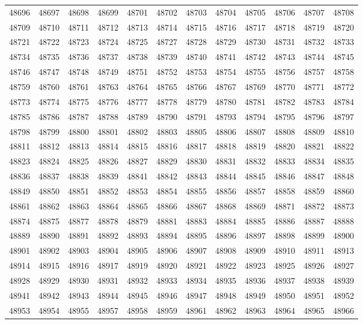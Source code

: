 \begin{center}
\begin{longtable}{llllllllllll}
48696 &48697 &48698 &48699 &48701 &48702 &48703 &48704 &48705 &48706 &48707 &48708 \\
48709 &48710 &48711 &48712 &48713 &48714 &48715 &48716 &48717 &48718 &48719 &48720 \\
48721 &48722 &48723 &48724 &48725 &48727 &48728 &48729 &48730 &48731 &48732 &48733 \\
48734 &48735 &48736 &48737 &48738 &48739 &48740 &48741 &48742 &48743 &48744 &48745 \\
48746 &48747 &48748 &48749 &48751 &48752 &48753 &48754 &48755 &48756 &48757 &48758 \\
48759 &48760 &48761 &48763 &48764 &48765 &48766 &48767 &48769 &48770 &48771 &48772 \\
48773 &48774 &48775 &48776 &48777 &48778 &48779 &48780 &48781 &48782 &48783 &48784 \\
48785 &48786 &48787 &48788 &48789 &48790 &48791 &48793 &48794 &48795 &48796 &48797 \\
48798 &48799 &48800 &48801 &48802 &48803 &48805 &48806 &48807 &48808 &48809 &48810 \\
48811 &48812 &48813 &48814 &48815 &48816 &48817 &48818 &48819 &48820 &48821 &48822 \\
48823 &48824 &48825 &48826 &48827 &48829 &48830 &48831 &48832 &48833 &48834 &48835 \\
48836 &48837 &48838 &48839 &48841 &48842 &48843 &48844 &48845 &48846 &48847 &48848 \\
48849 &48850 &48851 &48852 &48853 &48854 &48855 &48856 &48857 &48858 &48859 &48860 \\
48861 &48862 &48863 &48864 &48865 &48866 &48867 &48868 &48869 &48871 &48872 &48873 \\
48874 &48875 &48877 &48878 &48879 &48881 &48883 &48884 &48885 &48886 &48887 &48888 \\
48889 &48890 &48891 &48892 &48893 &48894 &48895 &48896 &48897 &48898 &48899 &48900 \\
48901 &48902 &48903 &48904 &48905 &48906 &48907 &48908 &48909 &48910 &48911 &48913 \\
48914 &48915 &48916 &48917 &48919 &48920 &48921 &48922 &48923 &48925 &48926 &48927 \\
48928 &48929 &48930 &48931 &48932 &48933 &48934 &48935 &48936 &48937 &48938 &48939 \\
48941 &48942 &48943 &48944 &48945 &48946 &48947 &48948 &48949 &48950 &48951 &48952 \\
48953 &48954 &48955 &48957 &48958 &48959 &48961 &48962 &48963 &48964 &48965 &48966 \\

\end{longtable}
\end{center}
